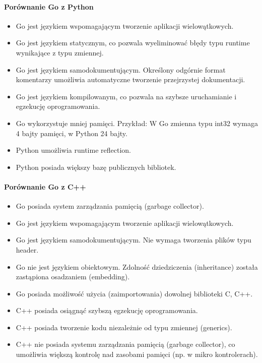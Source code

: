 \documentclass[a4paper,12pt,twoside,openany]{report}
\begin{document}
\paragraph{Porównanie Go z Python}
\begin{itemize}
 \item Go jest językiem wspomagającym tworzenie aplikacji wielowątkowych.
 \item Go jest językiem statycznym, co pozwala wyeliminować błędy typu runtime wynikające z typu zmiennej.
 \item Go jest językiem samodokumentującym. Określony odgórnie format komentarzy umożliwia automatyczne tworzenie przejrzystej dokumentacji.
 \item Go jest językiem kompilowanym, co pozwala na szybsze uruchamianie i egzekucję oprogramowania.
 \item Go wykorzystuje mniej pamięci. Przykład: W Go zmienna typu int32 wymaga 4 bajty pamięci, w Python 24 bajty.
 \item Python umożliwia runtime reflection.
 \item Python posiada większy bazę publicznych bibliotek.
\end{itemize}

\paragraph{Porównanie Go z C++}
\begin{itemize}
 \item Go posiada system zarządzania pamięcią (garbage collector).
 \item Go jest językiem wspomagającym tworzenie aplikacji wielowątkowych.
 \item Go jest językiem samodokumentującym. Nie wymaga tworzenia plików typu header.
 \item Go nie jest językiem obiektowym. Zdolność dziedziczenia (inheritance) została zastąpiona osadzaniem (embedding).
 \item Go posiada możliwość użycia (zaimportowania) dowolnej biblioteki C, C++.
 \item C++ posiada osiągnąć szybszą egzekucję oprogramowania.
 \item C++ posiada tworzenie kodu niezależnie od typu zmiennej (generics).
 \item C++ nie posiada systemu zarządzania pamięcią (garbage collector), co umożliwia większą kontrolę nad zasobami pamięci (np. w mikro kontrolerach).
\end{itemize}
\end{document}
